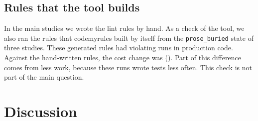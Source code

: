 \documentclass[pdflatex,sn-basic]{sn-jnl}
\newcommand{\arm}[1]{\texttt{#1}}
\begin{document}
\subsection{Rules that the tool builds}

In the main studies we wrote the lint rules by hand.
As a check of the tool, we also ran the rules that codemyrules built by itself from the \arm{prose\_buried} state of three studies.
These generated rules had \GenBreaks{} violating runs in production code.
Against the hand-written rules, the cost change was \GenCost{} (\GenCI).
Part of this difference comes from less work, because these runs wrote tests less often.
This check is not part of the main question.

\section{Discussion}
\label{sec:discussion}
\end{document}
